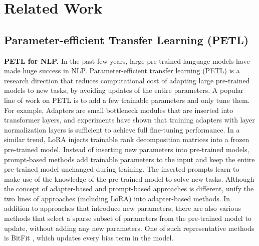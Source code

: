 \section{Related Work}

\subsection{Parameter-efficient Transfer Learning (PETL)}

\textbf{PETL for NLP.} In the past few years, large pre-trained language models have made huge success in NLP. Parameter-efficient transfer learning (PETL) is a research direction that reduces computational cost of adapting large pre-trained models to new tasks, by avoiding updates of the entire parameters. A popular line of work on PETL is to add a few trainable parameters and only tune them. For example, Adapters \cite{Rusu2016ProgressiveNN,houlsby2019parameter} are small bottleneck modules that are inserted into transformer layers, and experiments have shown that training adapters with layer normalization layers is sufficient to achieve full fine-tuning performance. In a similar trend, LoRA \cite{hu2021lora} injects trainable rank decomposition matrices into a frozen pre-trained model. Instead of inserting new parameters into pre-trained models, prompt-based \cite{Lester2021ThePO,li2021prefix} methods add trainable parameters to the input and keep the entire pre-trained model unchanged during training. The inserted prompts learn to make use of the knowledge of the pre-trained model to solve new tasks. Although the concept of adapter-based and prompt-based approaches is different, \citet{he2022towards} unify the two lines of approaches (including LoRA) into adapter-based methods. In addition to approaches that introduce new parameters, there are also various methods \cite{sung2021training,zaken2021bitfit,guo2021parameter} that select a sparse subset of parameters from the pre-trained model to update, without adding any new parameters. One of such representative methods is BitFit \cite{zaken2021bitfit}, which updates every bias term in the model.

